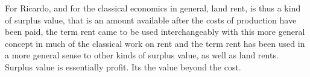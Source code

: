  


For Ricardo, and for the classical economics in general, land rent, is thus a kind of surplus value, that is an amount available after the costs of production have been paid, the term rent came to be used interchangeably with this more general concept in much of the classical work on rent and the term rent has been used in a more general sense to other kinds of surplus value, as well as land rents. 
Surplus value is essentially profit. Its the value beyond the cost. 
 

